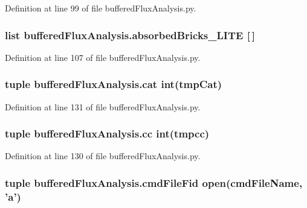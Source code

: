Definition at line 99 of file buffered\-Flux\-Analysis.\-py.

\hypertarget{namespacebuffered_flux_analysis_a4d8afcc76cdbe3ba251368426147cefd}{
\subsubsection[{absorbed\-Bricks\-\_\-\-L\-I\-T\-E}]{\setlength{\rightskip}{0pt plus 5cm}list buffered\-Flux\-Analysis.\-absorbed\-Bricks\-\_\-\-L\-I\-T\-E \mbox{[}$\,$\mbox{]}}}\label{namespacebuffered_flux_analysis_a4d8afcc76cdbe3ba251368426147cefd}


Definition at line 107 of file buffered\-Flux\-Analysis.\-py.

\hypertarget{namespacebuffered_flux_analysis_a651bc7229b13b20528ca1a79030c6ac7}{
\subsubsection[{cat}]{\setlength{\rightskip}{0pt plus 5cm}tuple buffered\-Flux\-Analysis.\-cat int(tmp\-Cat)}}\label{namespacebuffered_flux_analysis_a651bc7229b13b20528ca1a79030c6ac7}


Definition at line 131 of file buffered\-Flux\-Analysis.\-py.

\hypertarget{namespacebuffered_flux_analysis_a81b885fbd3a11be21610fd96c82952b7}{
\subsubsection[{cc}]{\setlength{\rightskip}{0pt plus 5cm}tuple buffered\-Flux\-Analysis.\-cc int(tmpcc)}}\label{namespacebuffered_flux_analysis_a81b885fbd3a11be21610fd96c82952b7}


Definition at line 130 of file buffered\-Flux\-Analysis.\-py.

\hypertarget{namespacebuffered_flux_analysis_a6b17587fb0cc6eb8ae770e1dbc5b1d97}{
\subsubsection[{cmd\-File\-Fid}]{\setlength{\rightskip}{0pt plus 5cm}tuple buffered\-Flux\-Analysis.\-cmd\-File\-Fid open({\bf cmd\-File\-Name}, '{\bf a}')}}\label{namespacebuffered_flux_analysis_a6b17587fb0cc6eb8ae770e1dbc5b1d97}



